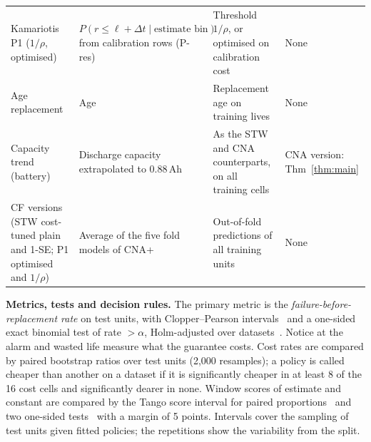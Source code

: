 \begin{table}[t]
\begin{tabular}{@{}p{}p{}p{}p{}@{}}
Kamariotis P1 ($1/\rho$, optimised) & $P(r\le\ell+\Delta t\mid\text{estimate bin})$ from calibration rows (P-res) & Threshold $1/\rho$, or optimised on calibration cost & None \\
Age replacement & Age & Replacement age on training lives & None \\
Capacity trend (battery) & Discharge capacity extrapolated to 0.88\,Ah & As the STW and CNA counterparts, on all training cells & CNA version: Thm~\ref{thm:main} \\
CF versions (STW cost-tuned plain and 1-SE; P1 optimised and $1/\rho$) & Average of the five fold models of CNA+ & Out-of-fold predictions of all training units & None \\
\bottomrule
\end{tabular}
\end{table}

\textbf{Metrics, tests and decision rules.} The primary metric is the \emph{failure-before-replacement rate} on test units, with Clopper--Pearson intervals~\cite{clopper1934} and a one-sided exact binomial test of rate $>\alpha$, Holm-adjusted over datasets~\cite{holm1979}. Notice at the alarm and wasted life measure what the guarantee costs. Cost rates are compared by paired bootstrap ratios over test units (2,000 resamples); a policy is called cheaper than another on a dataset if it is significantly cheaper in at least 8 of the 16 cost cells and significantly dearer in none. Window scores of estimate and constant are compared by the Tango score interval for paired proportions~\cite{tango1998} and two one-sided tests~\cite{schuirmann1987} with a margin of 5 points. Intervals cover the sampling of test units given fitted policies; the repetitions show the variability from the split.
